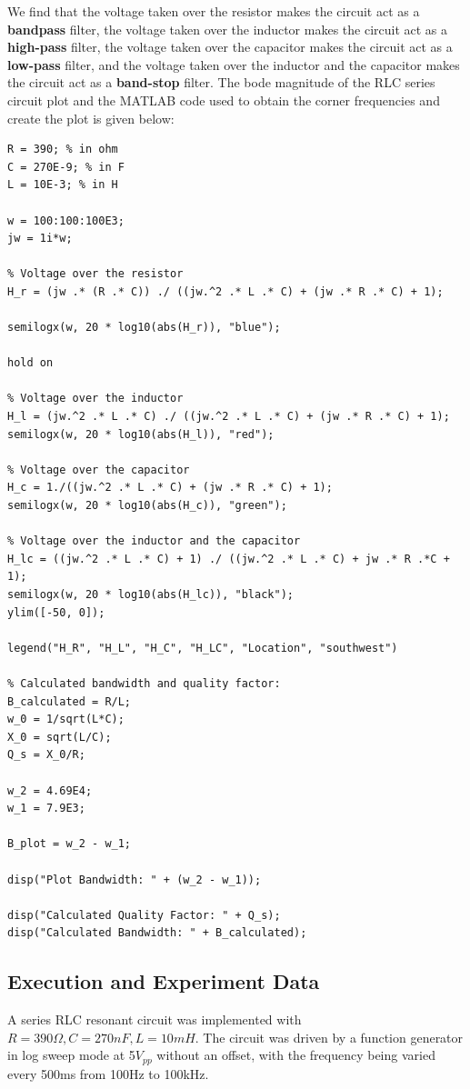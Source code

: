 We find that the voltage taken over the resistor makes the circuit act as a {\bf bandpass} filter, the voltage taken over the
inductor makes the circuit act as a {\bf high-pass} filter,
the voltage taken over the capacitor makes the circuit act as a {\bf low-pass} filter, and the voltage taken over the inductor and the capacitor makes the circuit act as a {\bf band-stop} filter.
The bode magnitude of the RLC series circuit plot and the MATLAB code used to obtain the corner frequencies and create the plot is given below:
\begin{verbatim}
R = 390; % in ohm
C = 270E-9; % in F
L = 10E-3; % in H

w = 100:100:100E3;
jw = 1i*w;

% Voltage over the resistor
H_r = (jw .* (R .* C)) ./ ((jw.^2 .* L .* C) + (jw .* R .* C) + 1);

semilogx(w, 20 * log10(abs(H_r)), "blue");

hold on

% Voltage over the inductor
H_l = (jw.^2 .* L .* C) ./ ((jw.^2 .* L .* C) + (jw .* R .* C) + 1);
semilogx(w, 20 * log10(abs(H_l)), "red");

% Voltage over the capacitor
H_c = 1./((jw.^2 .* L .* C) + (jw .* R .* C) + 1);
semilogx(w, 20 * log10(abs(H_c)), "green");

% Voltage over the inductor and the capacitor
H_lc = ((jw.^2 .* L .* C) + 1) ./ ((jw.^2 .* L .* C) + jw .* R .*C + 1);
semilogx(w, 20 * log10(abs(H_lc)), "black");
ylim([-50, 0]);

legend("H_R", "H_L", "H_C", "H_LC", "Location", "southwest")

% Calculated bandwidth and quality factor:
B_calculated = R/L;
w_0 = 1/sqrt(L*C);
X_0 = sqrt(L/C);
Q_s = X_0/R;

w_2 = 4.69E4;
w_1 = 7.9E3;

B_plot = w_2 - w_1;

disp("Plot Bandwidth: " + (w_2 - w_1));

disp("Calculated Quality Factor: " + Q_s);
disp("Calculated Bandwidth: " + B_calculated);
\end{verbatim}

\subsection{Execution and Experiment Data}
A series RLC resonant circuit was implemented with $R=390\Omega, C=270nF, L=10mH$. The circuit was driven by a function generator in log sweep mode at 5$V_{pp}$ without an offset, with the frequency being varied every 500ms from 100Hz to 100kHz.

